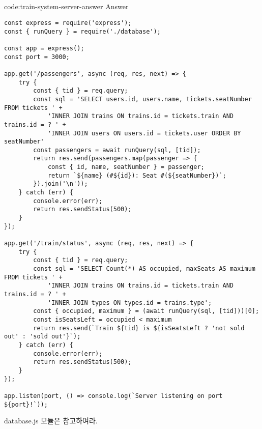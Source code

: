 \subsection*{}

\begin{codeenv}{code:train-system-server-answer}{ Answer}\begin{verbatim}
const express = require('express');
const { runQuery } = require('./database');

const app = express();
const port = 3000;

app.get('/passengers', async (req, res, next) => {
    try {
        const { tid } = req.query;
        const sql = 'SELECT users.id, users.name, tickets.seatNumber FROM tickets ' +
            'INNER JOIN trains ON trains.id = tickets.train AND trains.id = ? ' +
            'INNER JOIN users ON users.id = tickets.user ORDER BY seatNumber'
        const passengers = await runQuery(sql, [tid]);
        return res.send(passengers.map(passenger => {
            const { id, name, seatNumber } = passenger;
            return `${name} (#${id}): Seat #(${seatNumber})`;
        }).join('\n'));
    } catch (err) {
        console.error(err);
        return res.sendStatus(500);
    }
});

app.get('/train/status', async (req, res, next) => {
    try {
        const { tid } = req.query;
        const sql = 'SELECT Count(*) AS occupied, maxSeats AS maximum FROM tickets ' +
            'INNER JOIN trains ON trains.id = tickets.train AND trains.id = ? ' +
            'INNER JOIN types ON types.id = trains.type';
        const { occupied, maximum } = (await runQuery(sql, [tid]))[0];
        const isSeatsLeft = occupied < maximum
        return res.send(`Train ${tid} is ${isSeatsLeft ? 'not sold out' : 'sold out'}`);
    } catch (err) {
        console.error(err);
        return res.sendStatus(500);
    }
});

app.listen(port, () => console.log(`Server listening on port ${port}!`));
\end{verbatim}
\end{codeenv}

database.js 모듈은 \과 \를 참고하여라.
